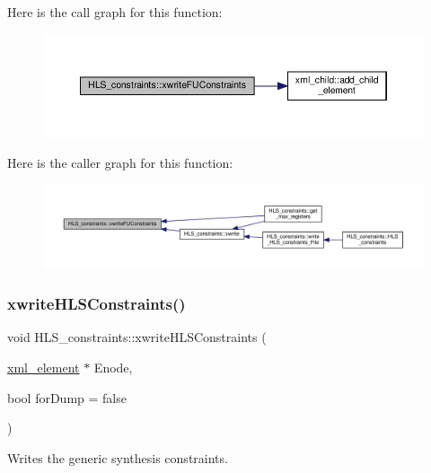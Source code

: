 Here is the call graph for this function\+:
\nopagebreak
\begin{figure}[H]
\begin{center}
\leavevmode
\includegraphics[width=350pt]{dd/d96/classHLS__constraints_ace5701a60c9f6c9a1b46c3b7681863c3_cgraph}
\end{center}
\end{figure}
Here is the caller graph for this function\+:
\nopagebreak
\begin{figure}[H]
\begin{center}
\leavevmode
\includegraphics[width=350pt]{dd/d96/classHLS__constraints_ace5701a60c9f6c9a1b46c3b7681863c3_icgraph}
\end{center}
\end{figure}
\mbox{\label{classHLS__constraints_af924912aeb49636faa808c66697bd1cb}} 
\subsubsection{\texorpdfstring{xwrite\+H\+L\+S\+Constraints()}{xwriteHLSConstraints()}}
{\footnotesize\ttfamily void H\+L\+S\+\_\+constraints\+::xwrite\+H\+L\+S\+Constraints (\begin{DoxyParamCaption}\item[{\hyperlink{classxml__element}{xml\+\_\+element} $\ast$}]{Enode,  }\item[{bool}]{for\+Dump = {\ttfamily false} }\end{DoxyParamCaption})}



Writes the generic synthesis constraints. 


